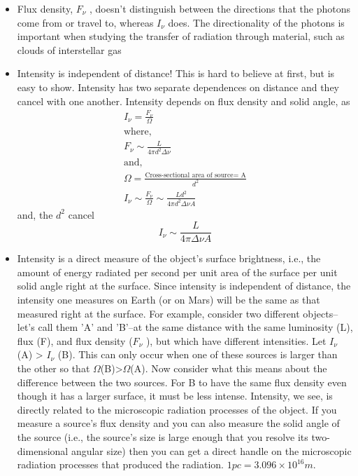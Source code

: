 \documentclass[10pt]{report}
\begin{document}
 \begin{itemize}
 \item Flux density, $F_\nu$ , doesn't distinguish between the directions that the photons come from or travel to, whereas $I_\nu$ does.  The directionality of the photons is important when studying the transfer of radiation through material, such as clouds of interstellar gas
 \item Intensity is independent of distance!  This is hard to believe at first, but is easy to show.  Intensity has two separate dependences on distance and they cancel with one another.  Intensity depends on flux density and solid angle, as
 \begin{eqnarray*}
 I_\nu=\frac{F_\nu}{\Omega}\\
 \text{where,}\\
 F_\nu \sim \frac{L}{4  \pi d^2 \Delta \nu}\\
 \text{and,}\\
 \Omega=\frac{\text{Cross-sectional area of source= A}}{d^2}\\
 I_\nu \sim \frac{F_\nu}{\Omega} \sim \frac{Ld^2}{4 \pi d^2 \Delta \nu A}
 \end{eqnarray*}
 and, the $d^2$ cancel
\begin{equation}
 I_\nu \sim \frac{L}{4 \pi \Delta \nu A}
\end{equation}
\item Intensity is a direct measure of the object's surface brightness, i.e., the amount of energy radiated per second per unit area of the surface per unit solid angle right at the surface.  Since intensity is independent of distance, the intensity one measures on Earth (or on Mars) will be the same as that measured right at the surface.   For example, consider two different objects--let's call them 'A' and 'B'--at the same distance with the same luminosity (L), flux (F), and flux density ($F_\nu$ ), but which have different intensities.  Let $I_\nu$ (A) > $I_\nu$ (B).  This can only occur when one of these sources is larger than the other so that $\Omega$(B)>$\Omega$(A).  Now consider what this means about the difference between the two sources.  For B to have the same flux density even though it has a larger surface, it must be less intense.  Intensity, we see, is directly related to the microscopic radiation processes of the object. If you measure a source's flux density and you can also measure the solid angle of the source (i.e., the source's size is large enough that you resolve its two-dimensional angular size) then you can get a direct handle on the microscopic radiation processes that produced the radiation.
\textbf{$1pc=3.096 \times10^{16}m$}.
 \end{itemize}
 
\end{document}

